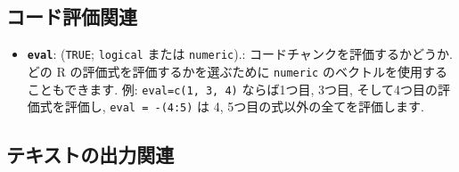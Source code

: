 \documentclass[
]{bxjsreport}
\providecommand{\tightlist}{%
  \setlength{\itemsep}{0pt}\setlength{\parskip}{0pt}}
\begin{document}
\hypertarget{evaluate}{%
\subsection{コード評価関連}\label{evaluate}}

\begin{itemize}
\tightlist
\item
  \textbf{\texttt{eval}}: (\texttt{TRUE}; \texttt{logical} または
  \texttt{numeric}).: コードチャンクを評価するかどうか. どの R
  の評価式を評価するかを選ぶために \texttt{numeric}
  のベクトルを使用することもできます. 例: \texttt{eval=c(1,\ 3,\ 4)}
  ならば1つ目, 3つ目, そして4つ目の評価式を評価し,
  \texttt{eval\ =\ -(4:5)} は 4, 5つ目の式以外の全てを評価します.
\end{itemize}

\hypertarget{text-output}{%
\subsection{テキストの出力関連}\label{text-output}}
\end{document}
